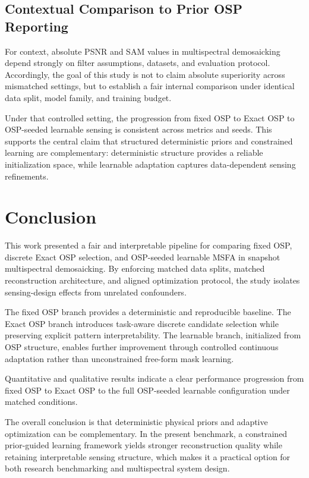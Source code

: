 \documentclass[journal]{IEEEtran}
\begin{document}
\subsection{Contextual Comparison to Prior OSP Reporting}
For context, absolute PSNR and SAM values in multispectral demosaicking depend strongly on filter assumptions, datasets, and evaluation protocol. Accordingly, the goal of this study is not to claim absolute superiority across mismatched settings, but to establish a fair internal comparison under identical data split, model family, and training budget.

Under that controlled setting, the progression from fixed OSP to Exact OSP to OSP-seeded learnable sensing is consistent across metrics and seeds. This supports the central claim that structured deterministic priors and constrained learning are complementary: deterministic structure provides a reliable initialization space, while learnable adaptation captures data-dependent sensing refinements.

\FloatBarrier

\section{Conclusion}
This work presented a fair and interpretable pipeline for comparing fixed OSP, discrete Exact OSP selection, and OSP-seeded learnable MSFA in snapshot multispectral demosaicking. By enforcing matched data splits, matched reconstruction architecture, and aligned optimization protocol, the study isolates sensing-design effects from unrelated confounders.

The fixed OSP branch provides a deterministic and reproducible baseline. The Exact OSP branch introduces task-aware discrete candidate selection while preserving explicit pattern interpretability. The learnable branch, initialized from OSP structure, enables further improvement through controlled continuous adaptation rather than unconstrained free-form mask learning.

Quantitative and qualitative results indicate a clear performance progression from fixed OSP to Exact OSP to the full OSP-seeded learnable configuration under matched conditions.

The overall conclusion is that deterministic physical priors and adaptive optimization can be complementary. In the present benchmark, a constrained prior-guided learning framework yields stronger reconstruction quality while retaining interpretable sensing structure, which makes it a practical option for both research benchmarking and multispectral system design.
\end{document}
